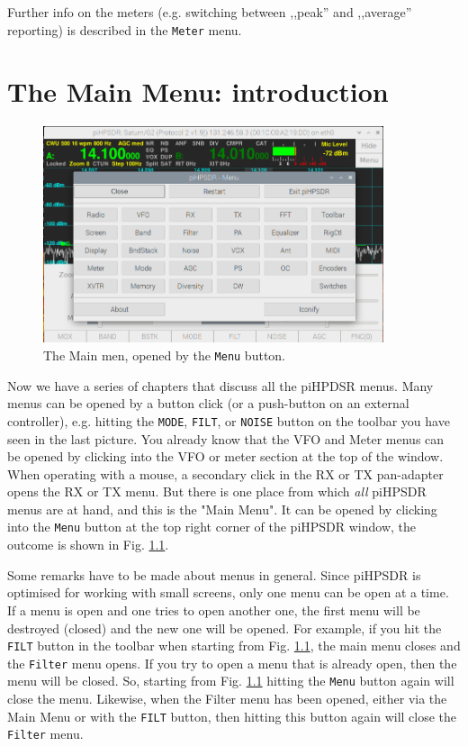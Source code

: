 \documentclass[12pt]{book}
\def\rett#1{\texttt{\color{red}#1}}
\def\bltt#1{\texttt{\color{blue}#1}}
\def\pH{pi\-HPSDR\xspace}
\begin{document}
Further info on the meters (e.g. switching between ,,peak'' and ,,average'' reporting)
is described in the \bltt{Meter} menu.

\chapter{The Main Menu: introduction}

\begin{figure}[ht]
\center
\includegraphics[width=10cm]{MainMenu.png}
\caption{The Main men, opened by the \rett{Menu} button.}
\label{fig:MainMenu}
\end{figure}

Now we have a series of chapters that discuss all the piHPDSR menus. Many menus can be
opened by a button click (or a push-button on an external controller), e.g. hitting the
 \rett{MODE}, \rett{FILT}, or \rett{NOISE} button on the
toolbar you have seen in the last picture. You already know that the VFO and Meter
menus can be opened by clicking into the VFO or meter section at the top of the window.
When operating with a mouse, a secondary click in the RX or TX pan-adapter opens the
RX or TX menu. But there is one place from which \textit{all} \pH menus are at hand,
and this is the "Main Menu". It can be opened by clicking into the \rett{Menu} button at the
top right corner of the \pH window, the outcome is shown in Fig. \ref{fig:MainMenu}.

Some remarks have to be made about menus in general. Since \pH is optimised for
working with small screens, only one menu can be open at a time. If a menu is open
and one tries to open another one, the first menu will be destroyed (closed) and the
new one will be opened. For example, if you hit the \rett{FILT} button in the toolbar
when starting from Fig. \ref{fig:MainMenu}, the main menu closes and the \bltt{Filter} menu
opens. If you try to open a menu that is already open, then the menu will be closed.
So, starting from Fig. \ref{fig:MainMenu} hitting the \rett{Menu} button again will close
the menu. Likewise, when the Filter menu has been opened, either via the Main Menu
or with the \rett{FILT} button, then hitting this button again will close the
\bltt{Filter} menu.
\end{document}
